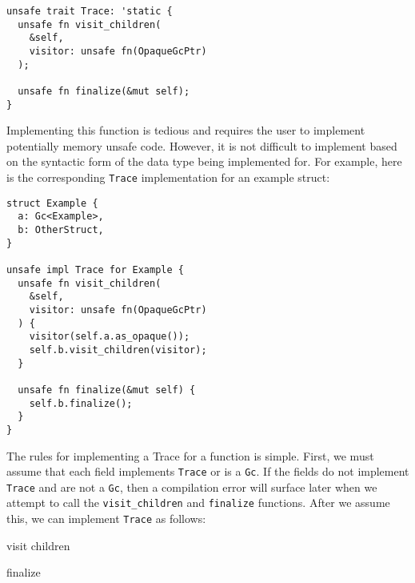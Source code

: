 \documentclass[sigplan,review,anonymous]{acmart}
\begin{document}
\begin{verbatim}
unsafe trait Trace: 'static {
  unsafe fn visit_children(
    &self,
    visitor: unsafe fn(OpaqueGcPtr)
  );

  unsafe fn finalize(&mut self);
}
\end{verbatim}

Implementing this function is tedious and requires the user to implement
potentially memory unsafe code. However, it is not difficult to implement based
on the syntactic form of the data type being implemented for. For example, here
is the corresponding \texttt{Trace} implementation for an example struct:

\begin{verbatim}
struct Example {
  a: Gc<Example>,
  b: OtherStruct,
}

unsafe impl Trace for Example {
  unsafe fn visit_children(
    &self,
    visitor: unsafe fn(OpaqueGcPtr)
  ) {
    visitor(self.a.as_opaque());
    self.b.visit_children(visitor);
  }

  unsafe fn finalize(&mut self) {
    self.b.finalize();
  }
}
\end{verbatim}

The rules for implementing a Trace for a function is simple. First, we must
assume that each field implements \texttt{Trace} or is a \texttt{Gc}. If the
fields do not implement \texttt{Trace} and are not a \texttt{Gc}, then a
compilation error will surface later when we attempt to call the
\texttt{visit\_children} and \texttt{finalize} functions. After we assume this,
we can implement \texttt{Trace} as follows:

\begin{algorithm}
  \caption{visit children}\label{alg:cap}

\end{algorithm}

\begin{algorithm}
  \caption{finalize}\label{alg:cap}

\end{algorithm}
\end{document}
